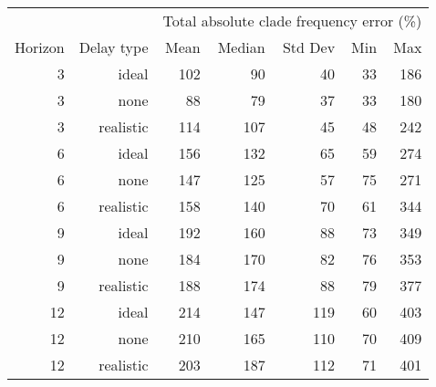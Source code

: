 
\begin{tabular*}{0.7\textwidth}{rrrrrrr}
\toprule
        &            & \multicolumn{5}{c}{Total absolute clade frequency error (\%)} \\
Horizon & Delay type & Mean & Median & Std Dev & Min & Max \\
\midrule

3 & ideal & 102 & 90 & 40 & 33 & 186 \\
3 & none & 88 & 79 & 37 & 33 & 180 \\
3 & realistic & 114 & 107 & 45 & 48 & 242 \\
6 & ideal & 156 & 132 & 65 & 59 & 274 \\
6 & none & 147 & 125 & 57 & 75 & 271 \\
6 & realistic & 158 & 140 & 70 & 61 & 344 \\
9 & ideal & 192 & 160 & 88 & 73 & 349 \\
9 & none & 184 & 170 & 82 & 76 & 353 \\
9 & realistic & 188 & 174 & 88 & 79 & 377 \\
12 & ideal & 214 & 147 & 119 & 60 & 403 \\
12 & none & 210 & 165 & 110 & 70 & 409 \\
12 & realistic & 203 & 187 & 112 & 71 & 401 \\

\bottomrule
\end{tabular*}

